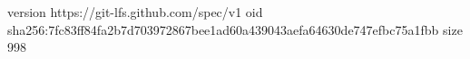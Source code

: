 version https://git-lfs.github.com/spec/v1
oid sha256:7fc83ff84fa2b7d703972867bee1ad60a439043aefa64630de747efbc75a1fbb
size 998
